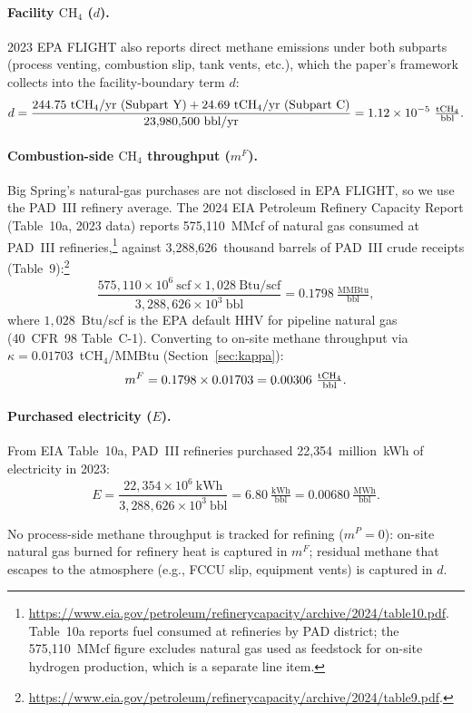 \documentclass[11pt]{article}
\newcommand{\chfour}{\ensuremath{\mathrm{CH_4}}}
\begin{document}
\paragraph{Facility \chfour{} ($d$).} 2023 EPA FLIGHT also reports direct methane emissions under both subparts (process venting, combustion slip, tank vents, etc.), which the paper's framework collects into the facility-boundary term $d$:
%
\[
  d = \frac{244.75~\text{t\chfour{}/yr (Subpart Y)} + 24.69~\text{t\chfour{}/yr (Subpart C)}}{23{,}980{,}500~\text{bbl/yr}} = 1.12\times10^{-5}~\tfrac{\text{t\chfour{}}}{\text{bbl}}.
\]

\paragraph{Combustion-side \chfour{} throughput ($m^F$).} Big Spring's natural-gas purchases are not disclosed in EPA FLIGHT, so we use the PAD~III refinery average. The 2024 EIA Petroleum Refinery Capacity Report (Table~10a, 2023 data) reports 575{,}110~MMcf of natural gas consumed at PAD~III refineries,\footnote{\url{https://www.eia.gov/petroleum/refinerycapacity/archive/2024/table10.pdf}. Table~10a reports fuel consumed at refineries by PAD district; the 575{,}110~MMcf figure excludes natural gas used as feedstock for on-site hydrogen production, which is a separate line item.} against 3{,}288{,}626~thousand barrels of PAD~III crude receipts (Table~9):\footnote{\url{https://www.eia.gov/petroleum/refinerycapacity/archive/2024/table9.pdf}.}
%
\[
  \frac{575{,}110\!\times\!10^{6}~\text{scf} \times 1{,}028~\text{Btu/scf}}{3{,}288{,}626\!\times\!10^{3}~\text{bbl}} = 0.1798~\tfrac{\text{MMBtu}}{\text{bbl}},
\]
%
where $1{,}028$~Btu/scf is the EPA default HHV for pipeline natural gas (40~CFR~98 Table~C-1). Converting to on-site methane throughput via $\kappa = 0.01703$~t\chfour{}/MMBtu (Section~\ref{sec:kappa}):
%
\[
  m^F = 0.1798 \times 0.01703 = 0.00306~\tfrac{\text{t\chfour{}}}{\text{bbl}}.
\]

\paragraph{Purchased electricity ($E$).} From EIA Table~10a, PAD~III refineries purchased 22{,}354~million~kWh of electricity in 2023:
%
\[
  E = \frac{22{,}354\!\times\!10^{6}~\text{kWh}}{3{,}288{,}626\!\times\!10^{3}~\text{bbl}} = 6.80~\tfrac{\text{kWh}}{\text{bbl}} = 0.00680~\tfrac{\text{MWh}}{\text{bbl}}.
\]

No process-side methane throughput is tracked for refining ($m^P = 0$): on-site natural gas burned for refinery heat is captured in $m^F$; residual methane that escapes to the atmosphere (e.g., FCCU slip, equipment vents) is captured in $d$.
\end{document}
